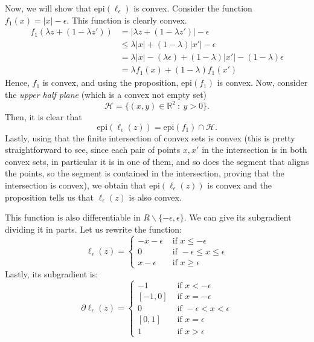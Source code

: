 \documentclass[11pt,table]{article}
\newcommand\abs[1]{\lvert#1\rvert}
\newcommand\R{\mathbb R}
\begin{document}
	Now, we will show that \(\text{epi}(\ell_\epsilon)\) is convex. Consider the function \(f_1(x) = \abs{x} - \epsilon\). This function is clearly convex.
	\begin{align*}
		f_1(\lambda z + (1-\lambda z')) & = \abs{\lambda z + (1-\lambda z')} - \epsilon                                      \\
		& \leq \lambda \abs{x} + (1-\lambda)\abs{x'} - \epsilon                              \\
		& = \lambda \abs{x} - (\lambda \epsilon) + (1-\lambda)\abs{x'} - (1-\lambda)\epsilon \\
		& = \lambda f_1(x) + (1-\lambda)f_1(x')
	\end{align*}
	Hence, \(f_1\) is convex, and using the proposition, \(\text{epi}(f_1)\) is convex. Now, consider the \emph{upper half plane} (which is a convex not empty set)
	\[
	\mathcal H = \{ (x,y) \in \R^2 \ : \ y > 0\}.
	\]
	Then, it is clear that
	\[
	\text{epi}(\ell_\epsilon(z)) = \text{epi}(f_1) \cap \mathcal H.
	\]
	Lastly, using that the finite intersection of convex sets is convex (this is pretty straightforward to see, since each pair of points \(x,x'\) in the intersection is in both convex sets, in particular it is in one of them, and so does the segment that aligns the points, so the segment is contained in the intersection, proving that the intersection is convex), we obtain that \(\text{epi}(\ell_\epsilon(z))\) is convex and the proposition tells us that \(\ell_\epsilon(z)\) is also convex.
	
	This function is also differentiable in \(R \backslash \{-\epsilon,\epsilon\}\). We can give its subgradient dividing it in parts. Let us rewrite the function:
	\[
	\ell_\epsilon(z) = \begin{cases}
		-x-\epsilon & \text{ if } x \le - \epsilon           \\
		0           & \text{ if } -\epsilon \le x \le \epsilon \\
		x-\epsilon  & \text{ if } x \ge \epsilon
	\end{cases}
	\]
	Lastly, its subgradient is:
	\[
	\partial \ell_\epsilon(z) = \begin{cases}
		-1 & \text{ if } x < - \epsilon           \\
		[-1,0] & \text{ if } x = - \epsilon           \\
		0  & \text{ if } -\epsilon < x < \epsilon \\
		[0,1] & \text{ if } x = \epsilon           \\
		1  & \text{ if } x> \epsilon
	\end{cases}
	\]
	
\end{document}
